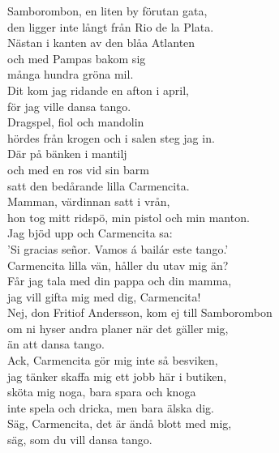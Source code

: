 \documentclass[a6paper,10pt]{article}
\begin{document}
\setlength{\oddsidemargin}{-0.37in}
\noindent
\begin{center}
\end{center}
\begin{lyrics}
Samborombon, en liten by förutan gata, \\
den ligger inte långt från Rio de la Plata. \\
Nästan i kanten av den blåa Atlanten \\
och med Pampas bakom sig \\
många hundra gröna mil. \\
Dit kom jag ridande en afton i april, \\
för jag ville dansa tango. 
\vspace{5pt}\\
Dragspel, fiol och mandolin \\
hördes från krogen och i salen steg jag in. \\
Där på bänken i mantilj \\
och med en ros vid sin barm\\
satt den bedårande lilla Carmencita. \\
Mamman, värdinnan satt i vrån, \\
hon tog mitt ridspö, min pistol och min manton. \\
Jag bjöd upp och Carmencita sa: \\
'Si gracias señor. Vamos á bailár este tango.' 
\vspace{5pt}\\
Carmencita lilla vän, håller du utav mig än? \\
Får jag tala med din pappa och din mamma, \\
jag vill gifta mig med dig, Carmencita! \\
Nej, don Fritiof Andersson, kom ej till Samborombon \\
om ni hyser andra planer när det gäller mig, \\
än att dansa tango. 
\vspace{5pt}\\
Ack, Carmencita gör mig inte så besviken, \\
jag tänker skaffa mig ett jobb här i butiken, \\
sköta mig noga, bara spara och knoga \\
inte spela och dricka, men bara älska dig. \\
Säg, Carmencita, det är ändå blott med mig, \\
säg, som du vill dansa tango. 


\end{lyrics}
\end{document}
